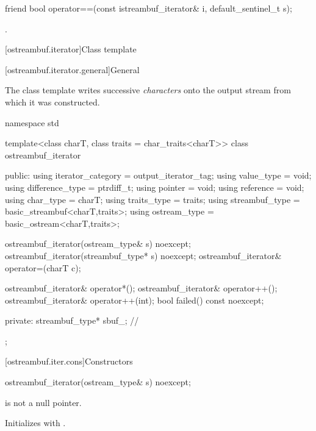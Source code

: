 %
\begin{itemdecl}
friend bool operator==(const istreambuf_iterator& i, default_sentinel_t s);
\end{itemdecl}

\begin{itemdescr}
\pnum
\returns
{}.
\end{itemdescr}

[ostreambuf.iterator]{Class template }

[ostreambuf.iterator.general]{General}

\pnum
The class template 
writes successive \textit{characters} onto the output stream
from which it was constructed.

%
\begin{codeblock}
namespace std {
  template<class charT, class traits = char_traits<charT>>
  class ostreambuf_iterator {
  public:
    using iterator_category = output_iterator_tag;
    using value_type        = void;
    using difference_type   = ptrdiff_t;
    using pointer           = void;
    using reference         = void;
    using char_type         = charT;
    using traits_type       = traits;
    using streambuf_type    = basic_streambuf<charT,traits>;
    using ostream_type      = basic_ostream<charT,traits>;

    ostreambuf_iterator(ostream_type& s) noexcept;
    ostreambuf_iterator(streambuf_type* s) noexcept;
    ostreambuf_iterator& operator=(charT c);

    ostreambuf_iterator& operator*();
    ostreambuf_iterator& operator++();
    ostreambuf_iterator& operator++(int);
    bool failed() const noexcept;

  private:
    streambuf_type* sbuf_;              // \expos
  };
}
\end{codeblock}

[ostreambuf.iter.cons]{Constructors}

%
\begin{itemdecl}
ostreambuf_iterator(ostream_type& s) noexcept;
\end{itemdecl}

\begin{itemdescr}
\pnum
\expects
{}
is not a null pointer.

\pnum
\effects
Initializes  with .
\end{itemdescr}

